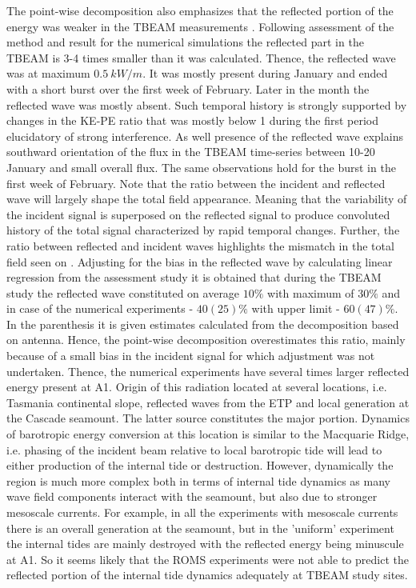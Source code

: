 \documentclass[12pt]{article}
\begin{document}
The point-wise decomposition also emphasizes that the reflected portion of the energy was weaker in the 
TBEAM measurements . Following assessment of the method and result 
for the numerical simulations the reflected part in the TBEAM is 3-4 times smaller than it was 
calculated. Thence, the reflected wave was at maximum $0.5~kW/m$. It 
was mostly present during January and ended with a short burst over the first week of February.  
Later in the month the reflected wave was mostly absent. Such temporal history is strongly 
supported by changes in the KE-PE ratio that was mostly below 1 during the first period 
elucidatory of strong interference. As well presence of the reflected wave explains southward 
orientation of the flux in the TBEAM time-series between 10-20 January and small overall flux. The 
same observations hold for the burst in the first week of February. Note that the ratio 
between the incident and reflected wave will largely shape the total field appearance. Meaning that 
the variability of the incident signal is superposed on the reflected signal to produce convoluted 
history of the total signal characterized by rapid temporal changes. Further, the ratio between 
reflected and incident waves highlights the mismatch in the total field seen on 
. Adjusting for the bias in the reflected wave by calculating linear 
regression from the assessment study  it is obtained that during 
the TBEAM study the reflected wave constituted on average $10\%$ with maximum of $30\%$ and in case 
of the numerical experiments - $40(25)\%$ with upper limit - $60(47)\%$. In the parenthesis it is 
given estimates calculated from the decomposition based on antenna. Hence, the point-wise 
decomposition overestimates this ratio, mainly because of a small bias in the incident signal for 
which adjustment was not undertaken. Thence, the numerical experiments have several times larger 
reflected energy present at A1. Origin of this radiation located at several locations, i.e. 
Tasmania continental slope, reflected waves from the ETP and local generation at the 
Cascade seamount. The latter source constitutes the major portion. Dynamics of barotropic energy 
conversion at this location is similar to the Macquarie Ridge, i.e. phasing of the incident beam 
relative to local barotropic tide will lead to either production of the internal tide or 
destruction. However, dynamically the region is much more complex both in terms of internal tide 
dynamics as many wave field components interact with the seamount, but also due to stronger 
mesoscale currents. For example, in all the experiments with mesoscale currents there is an overall 
generation at the seamount, but in the 'uniform' experiment the internal tides are mainly 
destroyed with the reflected energy being minuscule at A1. So it seems likely that the ROMS 
experiments were not able to predict the reflected portion of the internal tide dynamics adequately at TBEAM study sites.\\
\end{document}
